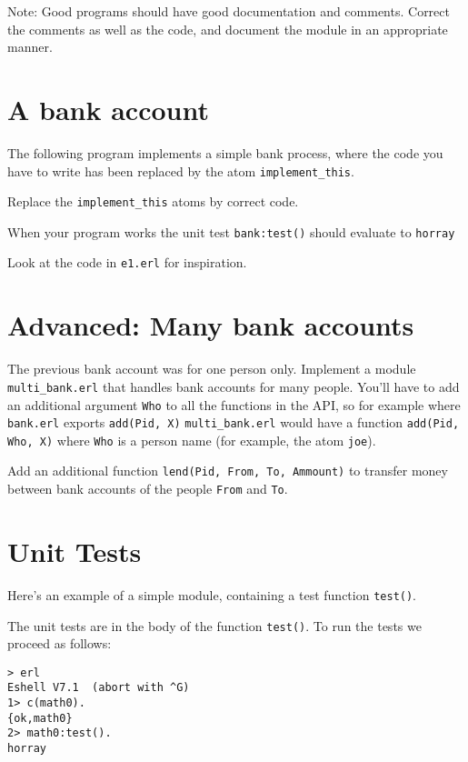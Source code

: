 \documentclass[12pt]{hitec}
\begin{document}
Note: Good programs should have good documentation and
comments. Correct the comments as well as the code, and document the
module in an appropriate manner.



\section{A bank account}

The following program implements a simple bank process, where the code
you have to write has been replaced by the atom \verb+implement_this+.

Replace the \verb+implement_this+ atoms by correct code. 


When your program works the unit test \verb+bank:test()+ should
evaluate to \verb+horray+

Look at the code in \verb+e1.erl+ for inspiration.



\section{Advanced: Many bank accounts}

The previous bank account was for one person only. Implement a module
\verb+multi_bank.erl+ that handles bank accounts for many
people. You'll have to add an additional argument \verb+Who+ to all
the functions in the API, so for example where \verb+bank.erl+ exports
\verb+add(Pid, X)+ \verb+multi_bank.erl+ would have a function
\verb+add(Pid, Who, X)+ where \verb+Who+ is a person name (for example, the
atom \verb+joe+).

Add an additional function \verb+lend(Pid, From, To, Ammount)+ to
transfer money between bank accounts of the people \verb+From+ and \verb+To+.

\section{Unit Tests}

Here's an example of a simple module, containing a test function \verb+test()+.


The unit tests are in the body of the function \verb+test()+. To run the tests
we proceed as follows:

\begin{verbatim}
> erl
Eshell V7.1  (abort with ^G)
1> c(math0).
{ok,math0}
2> math0:test().
horray
\end{verbatim}
\end{document}
